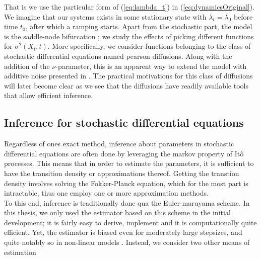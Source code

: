 That is we use the particular form of (\ref{eq:lambda_t}) in (\ref{eq:dynamicsOriginal}). We imagine that our systems exists in some stationary state with $\lambda_t = \lambda_0$ before time $t_0$, after which a ramping starts. Apart from the stochastic part, the model is the saddle-node bifurcation \cite{Strogatz2019_gv}; we study the effects of picking different functions for $\sigma^2(X_t, t)$. More specifically, we consider functions belonging to the class of stochastic differential equations named pearson diffusions. Along with the addition of the $\nu$-parameter, this is an apparent way to extend the model with additive noise presented in \cite[equation (1)]{Ditlevsen2023}. The practical motivations for this class of diffusions will later become clear as we see that the diffusions have readily available tools that allow efficient inference.
\subsection{Inference for stochastic differential equations}
Regardless of ones exact method, inference about parameters in stochastic differential equations are often done by leveraging the markov property of Itô processes. This means that in order to estimate the parameters, it is sufficient to have the transition density or approximations thereof. Getting the transtion density involves solving the Fokker-Planck equation, which for the most part is intractable, thus one employ one or more approximation methods.\\
To this end, inference is traditionally done qua the Euler-maruyama scheme. In this thesis, we only used the estimator based on this scheme in the initial development; it is fairly easy to derive, implement and it is computationally quite efficient. Yet, the estimator is biased even for moderately large stepsizes, and quite notably so in non-linear models \cite{SplittingSchemes}. Instead, we consider two other means of estimation 
